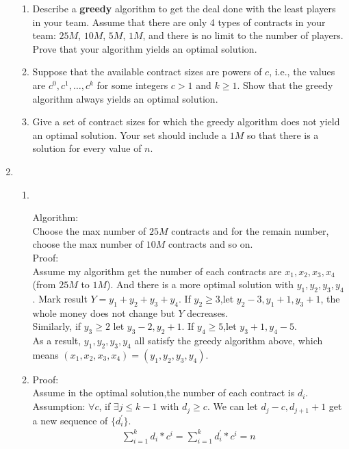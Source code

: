 \documentclass[12pt,a4paper]{article}
\makeatletter
\newtheorem*{solution}{Solution}
\theoremstyle{definition}
\renewenvironment{solution}[1][Solution] {\par\pushQED{\qed}\normalfont\topsep6\p@\@plus6\p@\relax\trivlist\item[\hskip\labelsep\bfseries#1\@addpunct{.}]\ignorespaces}{\popQED\endtrivlist\@endpefalse} \makeatother
\makeatother
\begin{document}
\begin{enumerate}
	\begin{enumerate}
		\item Describe a \textbf{greedy} algorithm to get the deal done with the least players in your team. Assume that there are only 4 types of contracts in your team: $25M$, $ 10M $, $ 5M $, $ 1M $, and there is no limit to the number of players. Prove that your algorithm yields an optimal solution.
		\item Suppose that the available contract sizes are powers of $c$,
		i.e., the values are $c^{0}, c^{1}, \ldots, c^{k}$ for some integers $c>1$ and $k \geq 1$. Show that the greedy algorithm always yields an optimal solution.
		\item Give a set of contract sizes for which the greedy algorithm does not yield an optimal solution. Your set should include a $ 1M $ so that there is a solution for every value of $ n $.
	\end{enumerate}
    \begin{solution}
       \begin{enumerate}
           \item~\par Algorithm:\\
           Choose the max number of $25M$ contracts and for the remain number, choose the max number of $10M$ contracts and so on.\\
           Proof:\\Assume my algorithm get the number of each contracts are $x_1,x_2,x_3,x_4$ (from $25M$ to $1M$). And there is a more optimal solution with $y_1,y_2,y_3,y_4$. Mark result $Y=y_1+y_2+y_3+y_4$. If $y_2\ge3$,let $y_2-3,y_1+1,y_3+1$, the whole money does not change but $Y$ decreases.\\
           Similarly, if $y_3\ge2$ let $y_3-2,y_2+1$. If $y_4\ge 5$,let $y_3+1,y_4-5$.\\ As a result, $y_1,y_2,y_3,y_4$ all satisfy the greedy algorithm above, which means $(x_1,x_2,x_3,x_4)=(y_1,y_2,y_3,y_4)$.
            \item
            Proof:\\
            Assume in the optimal solution,the number of each contract is $d_i$.\\
            Assumption: $\forall c$, if $\exists j\le k-1$ with $d_j\ge c$. We can let $d_j-c, d_{j+1}+1$ get a new sequence of $\{d_{i}^{'}\}$. 
            \begin{equation}
            \begin{aligned}
                \sum_{i=1}^{k}d_i*c^i=\sum_{i=1}^{k}d_{i}^{'}*c^i=n\\

\end{aligned}
\end{equation}
\end{enumerate}
\end{solution}
\end{enumerate}
\end{document}
